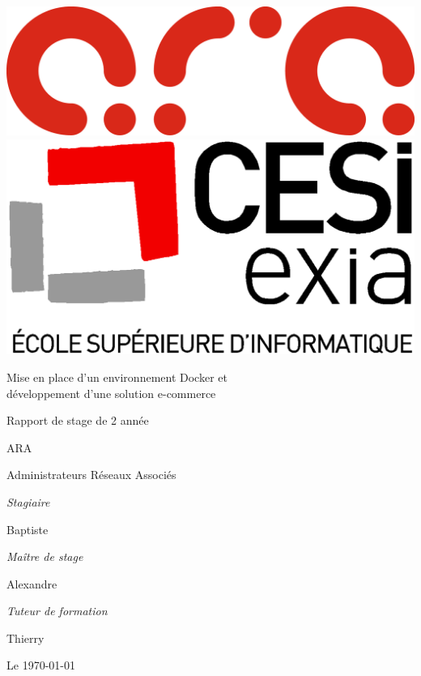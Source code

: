 \documentclass{Article}
\begin{document}
\begin{titlepage}

	\includegraphics[scale=0.4]{logo-ara.png}
	\hfill
	\includegraphics[scale=0.15]{logo-exia.png}

	\vfill
	\centering
	{\huge Mise en place d'un environnement Docker et \\ développement d'une solution e-commerce}\par
	\vspace{1cm}
	\begin{minipage}{0.45\textwidth}
	\raggedleft
	{\Large Rapport de stage de 2 année}\par
	\vspace{0.25cm}
	{\Large ARA }\par
	\vspace{0.25cm}
	{\Large Administrateurs Réseaux Associés}\par
	\end{minipage}\hspace{1.5cm}%
	\begin{minipage}{0.2\textwidth}
	\raggedright
	\textit{Stagiaire}\par
	Baptiste \par
	\vspace{0.25cm}
	\textit{Maître de stage}\par
	Alexandre \par
	\vspace{0.25cm}
	\textit{Tuteur de formation}\par
	Thierry \par
	\end{minipage}
	\vfill

	\raggedleft
	{\large Le \today}
\end{titlepage}
\end{document}
